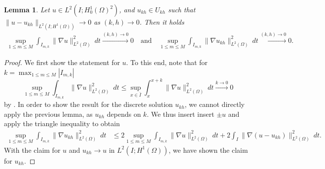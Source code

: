 \documentclass{m2an}
\newtheorem{lemma}[theorem]{Lemma}
\newcommand{\Ukh}{U_{kh}}
\newcommand{\ukh}{u_{kh}}
\begin{document}
\begin{lemma}\label{lemm:vanishing_support_u}
  Let $u \in L^2(I;H^1_0(\Omega)^2)$, and $u_{kh} \in \Ukh $ such that
  $\|u - u_{kh}\|_{L^2(I;H^1(\Omega))} \to 0$ as $(k,h) \to 0$. Then it holds
  \begin{align*}
    \sup_{1 \le m \le M} \int_{I_{m,k}} \|\nabla u\|_{L^2(\Omega)}^2 \ dt  \xrightarrow{(k,h) \to 0} 0
    \quad \text{and} \quad
    \sup_{1 \le m \le M} \int_{I_{m,k}} \|\nabla u_{kh}\|_{L^2(\Omega)}^2 \ dt \xrightarrow{(k,h) \to 0} 0.
  \end{align*}
\end{lemma}
\begin{proof}
  We first show the statement for $u$. To this end, note that for $k = \max_{1 \le m \le M} |I_{m,k}|$
  \begin{equation*}
      \sup_{1 \le m \le M} \int_{I_{m,k}} \|\nabla u\|_{L^2(\Omega)}^2 \ dt
      \le \sup_{x \in \bar I} \int_{x}^{x+k} \|\nabla u\|_{L^2(\Omega)}^2 \ dt \xrightarrow{k \to 0} 0
  \end{equation*}
  by .
  In order to show the result for the discrete solution $\ukh$, we cannot directly apply the previous 
  lemma, as $\ukh$ depends on $k$. We thus insert
  insert $\pm u$ and apply the triangle inequality to obtain
  \begin{align*}
      \sup_{1 \le m \le M} \int_{I_{m,k}} \|\nabla u_{kh}\|_{L^2(\Omega)}^2 \ dt
      & \le 2\sup_{1 \le m \le M} \int_{I_{m,k}} \|\nabla u\|_{L^2(\Omega)}^2 \ dt
      + 2\int_{I} \|\nabla (u - u_{kh})\|_{L^2(\Omega)}^2 \ dt.
  \end{align*}
  With the claim for $u$ and $u_{kh} \to u$ in $L^2(I;H^1(\Omega))$, we have shown the claim for $u_{kh}$.
\end{proof}
\end{document}

